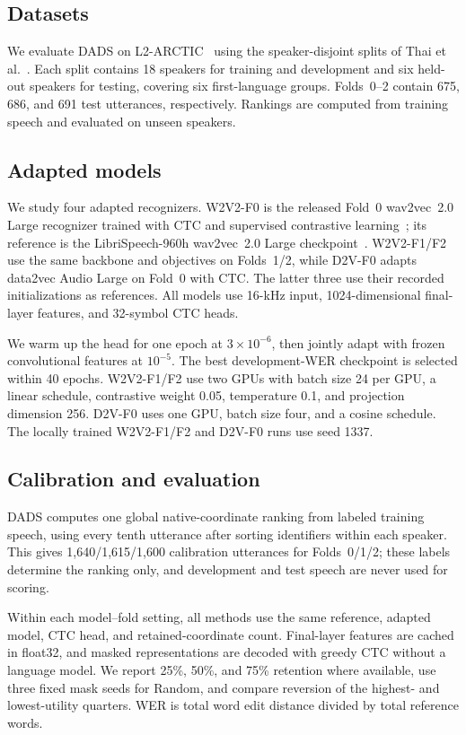 \documentclass{article}
\begin{document}
\subsection{Datasets}
We evaluate DADS on L2-ARCTIC~\cite{zhao2018l2arctic} using the speaker-disjoint splits of Thai et al.~\cite{thai2026contrastive}. Each split contains 18 speakers for training and development and six held-out speakers for testing, covering six first-language groups. Folds~0--2 contain 675, 686, and 691 test utterances, respectively. Rankings are computed from training speech and evaluated on unseen speakers.

\subsection{Adapted models}
We study four adapted recognizers. W2V2-F0 is the released Fold~0 wav2vec~2.0 Large recognizer trained with CTC and supervised contrastive learning~\cite{khosla2020supcon,thai2026contrastive}; its reference is the LibriSpeech-960h wav2vec~2.0 Large checkpoint~\cite{panayotov2015librispeech}. W2V2-F1/F2 use the same backbone and objectives on Folds~1/2, while D2V-F0 adapts data2vec Audio Large on Fold~0 with CTC. The latter three use their recorded initializations as references. All models use 16-kHz input, 1024-dimensional final-layer features, and 32-symbol CTC heads.

We warm up the head for one epoch at $3\times10^{-6}$, then jointly adapt with frozen convolutional features at $10^{-5}$. The best development-WER checkpoint is selected within 40 epochs. W2V2-F1/F2 use two GPUs with batch size 24 per GPU, a linear schedule, contrastive weight 0.05, temperature 0.1, and projection dimension 256. D2V-F0 uses one GPU, batch size four, and a cosine schedule. The locally trained W2V2-F1/F2 and D2V-F0 runs use seed 1337.

\subsection{Calibration and evaluation}
DADS computes one global native-coordinate ranking from labeled training speech, using every tenth utterance after sorting identifiers within each speaker. This gives 1,640/1,615/1,600 calibration utterances for Folds~0/1/2; these labels determine the ranking only, and development and test speech are never used for scoring.

Within each model--fold setting, all methods use the same reference, adapted model, CTC head, and retained-coordinate count. Final-layer features are cached in float32, and masked representations are decoded with greedy CTC without a language model. We report 25\%, 50\%, and 75\% retention where available, use three fixed mask seeds for Random, and compare reversion of the highest- and lowest-utility quarters. WER is total word edit distance divided by total reference words.
\end{document}
